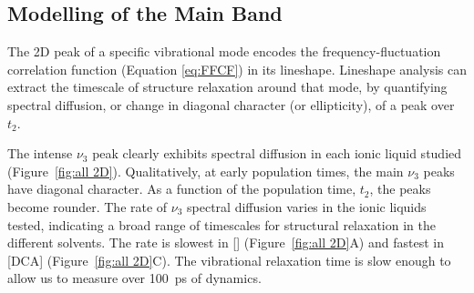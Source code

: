\documentclass[%
  class = book,%
  crop = false,%
  float = true,%
  multi = true,%
  preview = false,%
]{standalone}
\begin{document}
{\subsection{Modelling of the Main Band}
\label{sec:anions_2DIR_analysis}

The 2D peak of a specific vibrational mode encodes the frequency-fluctuation correlation function (Equation \ref{eq:FFCF}) in its lineshape. Lineshape analysis can extract the timescale of structure relaxation around that mode, by quantifying spectral diffusion, or change in diagonal character (or ellipticity), of a peak over \(t_2\).

The intense \(\nu_3\) peak clearly exhibits spectral diffusion in each ionic liquid studied (Figure~\ref{fig:all 2D}). Qualitatively, at early population times, the main \(\nu_3\) peaks have diagonal character. As a function of the population time, \(t_2\), the peaks become rounder. The rate of \(\nu_3\) spectral diffusion varies in the ionic liquids tested, indicating a broad range of timescales for structural relaxation in the different solvents. The rate is slowest in \ce{[Im_{4,1}]}[] (Figure~\ref{fig:all 2D}A) and fastest in \ce{[Im_{4,1}]}[DCA] (Figure~\ref{fig:all 2D}C). The vibrational relaxation time is slow enough to allow us to measure over \SI{100}{\ps} of dynamics.

}
\end{document}
